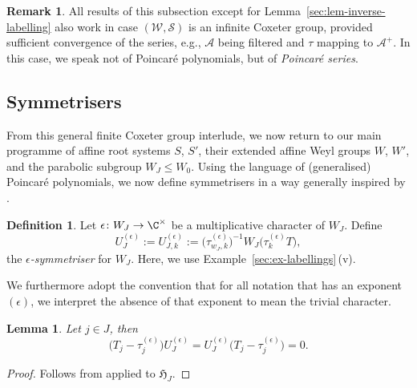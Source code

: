 \documentclass[10pt,a4paper]{amsart}
\newtheorem{Lemma}[Theorem]{Lemma}
\theoremstyle{definition}
\newtheorem{Definition}[Theorem]{Definition}
\newtheorem{Remark}[Theorem]{Remark}
\numberwithin{equation}{section}
\begin{document}
\begin{Remark}
 All results of this subsection except for Lemma~\ref{sec:lem-inverse-labelling} also work in case $(\mathcal{W},\mathcal{S})$ is an infinite
 Coxeter group, provided sufficient convergence of the series, e.g., $\mathcal{A}$ being filtered and $\tau$ mapping to $\mathcal{A}^+$.
 In this case, we speak not of Poincar\'e polynomials, but of \emph{Poincar\'e series}.
\end{Remark}

\subsection{Symmetrisers}
From this general finite Coxeter group interlude, we now return to our
main programme of affine root systems $S$, $S'$, their extended affine Weyl
groups $W$, $W'$, and the parabolic subgroup ${W_J\le W_0}$. Using the
language of (generalised) Poincar\'e polynomials, we now define symmetrisers
in a way generally inspired by \cite[Section~5.5]{macdonald}.

\begin{Definition}
 Let $\epsilon\colon W_J\to\C^\times$ be a multiplicative character of $W_J$.
 Define
 \[
 U^{(\epsilon)}_J := U^{(\epsilon)}_{J,k} := \bigl(\tau^{(\epsilon)}_{w_J,k}\bigr)^{-1} W_J\bigl(\tau^{(\epsilon)}_k T\bigr),
 \]
 the \emph{$\epsilon$-symmetriser} for $W_J$. Here, we use Example~\ref{sec:ex-labellings}\,(v).
\end{Definition}
We furthermore adopt the convention that for all notation that has an exponent $(\epsilon)$, we interpret the absence of that exponent to mean
the trivial character.

\begin{Lemma}\label{sec:lem-symmetriser-symmetric}
 Let $j\in J$, then
 \[
 \bigl(T_j-\tau^{(\epsilon)}_j\bigr)U^{(\epsilon)}_J =
 U^{(\epsilon)}_J \bigl(T_j-\tau^{(\epsilon)}_j\bigr) = 0.
 \]
\end{Lemma}
\begin{proof}
 Follows from \cite[Section~5.5.9]{macdonald} applied to $\mathfrak{H}_J$.
\end{proof}
\end{document}
